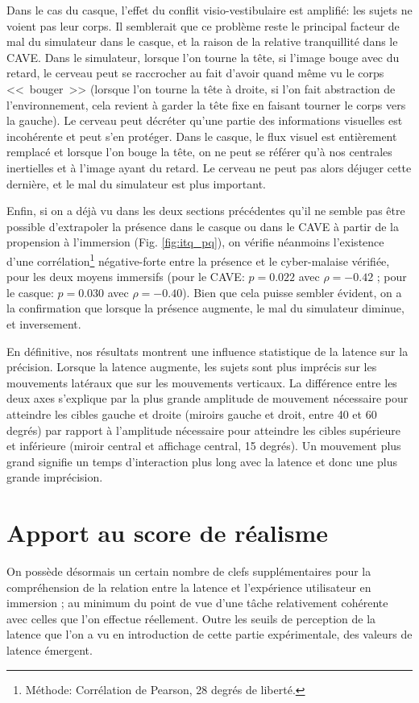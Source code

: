 	\par Dans le cas du casque, l'effet du conflit visio-vestibulaire est amplifié: les sujets ne voient pas leur corps. Il semblerait que ce problème reste le principal facteur de mal du simulateur dans le casque, et la raison de la relative tranquillité dans le CAVE. Dans le simulateur, lorsque l'on tourne la tête, si l'image bouge avec du retard, le cerveau peut se raccrocher au fait d'avoir quand même vu le corps <<~bouger~>> (lorsque l'on tourne la tête à droite, si l'on fait abstraction de l'environnement, cela revient à garder la tête fixe en faisant tourner le corps vers la gauche). Le cerveau peut décréter qu'une partie des informations visuelles est incohérente et peut s'en protéger. Dans le casque, le flux visuel est entièrement remplacé et lorsque l'on bouge la tête, on ne peut se référer qu'à nos centrales inertielles et à l'image ayant du retard. Le cerveau ne peut pas alors déjuger cette dernière, et le mal du simulateur est plus important.
	
	\par Enfin, si on a déjà vu dans les deux sections précédentes qu'il ne semble pas être possible d'extrapoler la présence dans le casque ou dans le CAVE à partir de la propension à l'immersion (Fig. \ref{fig:itq_pq}), on vérifie néanmoins l'existence d'une corrélation\footnote{Méthode: Corrélation de Pearson, 28 degrés de liberté.} négative-forte entre la présence et le cyber-malaise vérifiée, pour les deux moyens immersifs (pour le CAVE: $p = 0.022$ avec $\rho = -0.42$ ; pour le casque: $p = 0.030$ avec $\rho = -0.40$). Bien que cela puisse sembler évident, on a la confirmation que lorsque la présence augmente, le mal du simulateur diminue, et inversement.
	
	\par En définitive, nos résultats montrent une influence statistique de la latence sur la précision. Lorsque la latence augmente, les sujets sont plus imprécis sur les mouvements latéraux que sur les mouvements verticaux. La différence entre les deux axes s'explique par la plus grande amplitude de mouvement nécessaire pour atteindre les cibles gauche et droite (miroirs gauche et droit, entre 40 et 60 degrés) par rapport à l'amplitude nécessaire pour atteindre les cibles supérieure et inférieure (miroir central et affichage central, 15 degrés). Un mouvement plus grand signifie un temps d'interaction plus long avec la latence et donc une plus grande imprécision.
	
	\section{Apport au score de réalisme}
	\par On possède désormais un certain nombre de clefs supplémentaires pour la compréhension de la relation entre la latence et l'expérience utilisateur en immersion ; au minimum du point de vue d'une tâche relativement cohérente avec celles que l'on effectue réellement. Outre les seuils de perception de la latence que l'on a vu en introduction de cette partie expérimentale, des valeurs de latence émergent.
	
